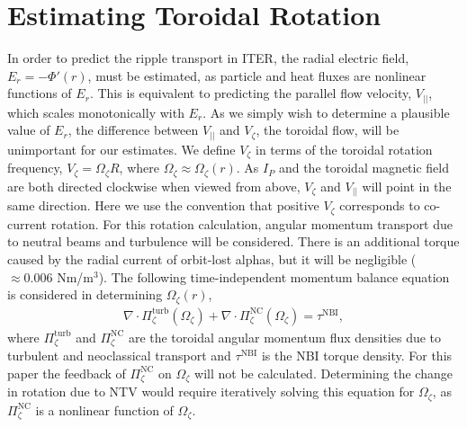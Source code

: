 \documentclass[aip, pop, preprint]{revtex4-1}
\begin{document}
\FloatBarrier

\section{Estimating Toroidal Rotation}\label{rotation}

In order to predict the ripple transport in ITER, the radial electric field, $E_r = - \Phi'(r) $, must be estimated, as particle and heat fluxes are nonlinear functions of $E_r$. This is equivalent to predicting the parallel flow velocity, $V_{||}$, which scales monotonically with $E_r$.  As we simply wish to determine a plausible value of $E_r$, the difference between $V_{||}$ and $V_{\zeta}$, the toroidal flow, will be unimportant for our estimates. We define $V_{\zeta}$ in terms of the toroidal rotation frequency, $V_{\zeta} = \Omega_{\zeta} R$, where $\Omega_{\zeta} \approx \Omega_{\zeta}(r)$. As $I_P$ and the toroidal magnetic field are both directed clockwise when viewed from above, $V_{\zeta}$ and $V_{||}$ will point in the same direction. Here we use the convention that positive $V_{\zeta}$ corresponds to co-current rotation. For this rotation calculation, angular momentum transport due to neutral beams and turbulence will be considered. There is an additional torque caused by the radial current of orbit-lost alphas,\cite{Rosenbluth1996} but it will be negligible ($\approx 0.006$ Nm/m$^3$). The following time-independent momentum balance equation is considered in determining $\Omega_{\zeta}(r)$,
\begin{gather}
\nabla \cdot \Pi_{\zeta}^{\mathrm{turb}}(\Omega_{\zeta}) + \nabla \cdot \Pi_{\zeta}^{\mathrm{NC}}(\Omega_{\zeta}) = \tau^{\mathrm{NBI}},
\end{gather}
where $\Pi^{\mathrm{turb}}_{\zeta}$ and $\Pi^{\mathrm{NC}}_{\zeta}$ are the toroidal angular momentum flux densities due to turbulent and neoclassical transport and $\tau^{\mathrm{NBI}}$ is the NBI torque density. For this paper the feedback of $\Pi_{\zeta}^{\mathrm{NC}}$ on $\Omega_{\zeta}$ will not be calculated. Determining the change in rotation due to NTV would require iteratively solving this equation for $\Omega_{\zeta}$, as $\Pi_{\zeta}^{\mathrm{NC}}$ is a nonlinear function of $\Omega_{\zeta}$. 
\end{document}
